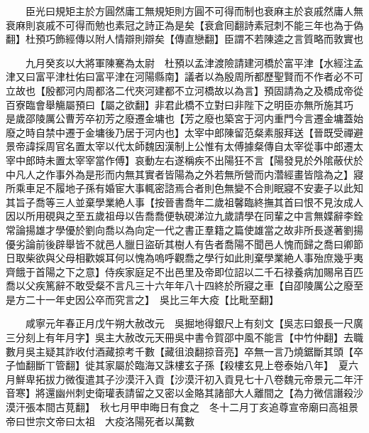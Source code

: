　　臣光曰規矩主於方圓然庸工無規矩則方圓不可得而制也衰麻主於哀戚然庸人無衰麻則哀戚不可得而勉也素冠之詩正為是矣【衰倉囘翻詩素冠刺不能三年也為于偽翻】杜預巧飾經傳以附人情辯則辯矣【傳直戀翻】臣謂不若陳逵之言質略而敦實也

　　九月癸亥以大將軍陳騫為太尉　杜預以孟津渡險請建河橋於富平津【水經注孟津又曰富平津杜佑曰富平津在河陽縣南】議者以為殷周所都歷聖賢而不作者必不可立故也【殷都河内周都洛二代夾河建都不立河橋故以為言】預固請為之及橋成帝從百寮臨會舉觴屬預曰【屬之欲翻】非君此橋不立對曰非陛下之明臣亦無所施其巧　是歲邵陵厲公曹芳卒初芳之廢遷金墉也【芳之廢也築宮于河内重門今言遷金墉蓋始廢之時自禁中遷于金墉後乃居于河内也】太宰中郎陳留范粲素服拜送【晉既受禪避景帝諱採周官名置太宰以代太師魏因漢制上公惟有太傅據粲傳自太宰從事中郎遷太宰中郎時未置太宰宰當作傅】哀動左右遂稱疾不出陽狂不言【陽發見於外隂蔽伏於中凡人之作事外為是形而内無其實者皆陽為之外若無所營而内濳經畫皆陰為之】寢所乘車足不履地子孫有婚宦大事輒密諮焉合者則色無變不合則眠寢不安妻子以此知其旨子喬等三人並棄學業絶人事【按晉書喬年二歲祖馨臨終撫其首曰恨不見汝成人因以所用硯與之至五歲祖母以告喬喬便執硯涕泣九歲請學在同輩之中言無媟辭李銓常論揚雄才學優於劉向喬以為向定一代之書正羣籍之篇使雄當之故非所長遂著劉揚優劣論前後辟舉皆不就邑人臘日盜斫其樹人有告者喬陽不聞邑人愧而歸之喬曰卿節日取柴欲與父母相歡娛耳何以愧為嗚呼觀喬之學行如此則棄學業絶人事殆庶幾乎夷齊餓于首陽之下之意】侍疾家庭足不出邑里及帝即位詔以二千石禄養病加賜帛百匹喬以父疾篤辭不敢受粲不言凡三十六年年八十四終於所寢之車【自卲陵厲公之廢至是方二十一年史因公卒而究言之】　吳比三年大疫【比毗至翻】

　　咸寧元年春正月戊午朔大赦改元　吳掘地得銀尺上有刻文【吳志曰銀長一尺廣三分刻上有年月字】吳主大赦改元天冊吳中書令賀邵中風不能言【中竹仲翻】去職數月吳主疑其詐收付酒藏掠考千數【藏徂浪翻掠音亮】卒無一言乃燒鋸斷其頭【卒子恤翻斷丅管翻】徙其家屬於臨海又誅樓玄子孫【殺樓玄見上卷泰始八年】　夏六月鮮卑拓拔力微復遣其子沙漠汗入貢【沙漠汗初入貢見七十八卷魏元帝景元二年汗音寒】將還幽州刺史衛瓘表請留之又密以金賂其諸部大人離間之【為力微信譖殺沙漠汗張本間古莧翻】　秋七月甲申晦日有食之　冬十二月丁亥追尊宣帝廟曰高祖景帝曰世宗文帝曰太祖　大疫洛陽死者以萬數

